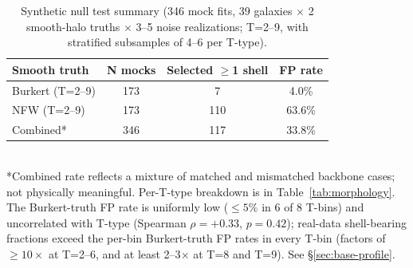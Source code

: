 \begin{table}
\centering
\caption{Synthetic null test summary (346 mock fits, 39 galaxies $\times$ 2 smooth-halo truths $\times$ 3--5 noise realizations; T=2--9, with stratified subsamples of 4--6 per T-type).}
\label{tab:null}
\begin{tabular}{lccc}
\toprule
Smooth truth & N mocks & Selected $\geq$1 shell & FP rate \\
\midrule
Burkert (T=2--9) & 173 & 7 & 4.0\% \\
NFW (T=2--9) & 173 & 110 & 63.6\% \\
Combined* & 346 & 117 & 33.8\% \\
\bottomrule
\end{tabular}
\\[0.5em]
\footnotesize{*Combined rate reflects a mixture of matched and mismatched backbone cases; not physically meaningful. Per-T-type breakdown is in Table~\ref{tab:morphology}. The Burkert-truth FP rate is uniformly low ($\leq 5\%$ in 6 of 8 T-bins) and uncorrelated with T-type (Spearman $\rho = +0.33$, $p = 0.42$); real-data shell-bearing fractions exceed the per-bin Burkert-truth FP rates in every T-bin (factors of $\geq 10\times$ at T=2--6, and at least 2--3$\times$ at T=8 and T=9). See \S\ref{sec:base-profile}.}
\end{table}

